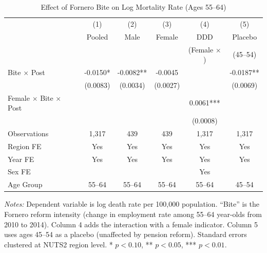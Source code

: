 \begin{table}[htbp]
\centering
\caption{Effect of Fornero Bite on Log Mortality Rate (Ages 55--64)}
\label{tab:main}
\begin{tabular}{lccccc}
\hline\hline
 & (1) & (2) & (3) & (4) & (5) \\
 & Pooled & Male & Female & DDD & Placebo \\
 & & & & (Female $\times$) & (45--54) \\
\hline
Bite $\times$ Post & -0.0150* & -0.0082** & -0.0045 & & -0.0187** \\
 & (0.0083) & (0.0034) & (0.0027) & & (0.0069) \\
Female $\times$ Bite $\times$ Post & & & & 0.0061*** & \\
 & & & & (0.0008) & \\
\hline
Observations & 1,317 & 439 & 439 & 1,317 & 1,317 \\
Region FE & Yes & Yes & Yes & Yes & Yes \\
Year FE & Yes & Yes & Yes & Yes & Yes \\
Sex FE & & & & Yes & \\
Age Group & 55--64 & 55--64 & 55--64 & 55--64 & 45--54 \\
\hline\hline
\end{tabular}
\begin{tablenotes}[flushleft]\small
\item \textit{Notes:} Dependent variable is log death rate per 100,000 population.
``Bite'' is the Fornero reform intensity (change in employment rate among 55--64
year-olds from 2010 to 2014). Column 4 adds the interaction with a female indicator.
Column 5 uses ages 45--54 as a placebo (unaffected by pension reform).
Standard errors clustered at NUTS2 region level.
* $p<0.10$, ** $p<0.05$, *** $p<0.01$.
\end{tablenotes}
\end{table}
